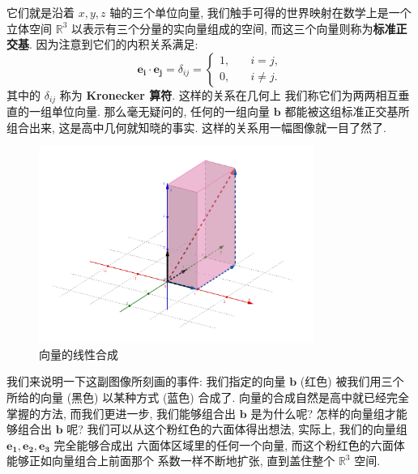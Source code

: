 \documentclass[UTF8]{book}
\begin{document}
    它们就是沿着 $x,y,z$ 轴的三个单位向量, 我们触手可得的世界映射在数学上是一个
    立体空间 $\mathbb{R}^3$ 以表示有三个分量的实向量组成的空间, 
    而这三个向量则称为\textbf{标准正交基}. 因为注意到它们的内积关系满足: 
    \begin{equation} \label{eq. orthonormal basis}
        \boldsymbol{e_i}\cdot \boldsymbol{e_j} = \delta_{ij} = 
        \begin{cases}
            1, \quad & i = j, \\
            0, \quad & i \neq j.
        \end{cases}
    \end{equation}
    其中的 $ \delta_{ij}$ 称为 \textbf{Kronecker 算符}. 这样的关系在几何上
    我们称它们为两两相互垂直的一组单位向量. 那么毫无疑问的, 任何的一组向量 
    $\boldsymbol{b}$ 都能被这组标准正交基所组合出来, 这是高中几何就知晓的事实. 
    这样的关系用一幅图像就一目了然了. 

    \begin{figure}[hbtp]
        \centering
        \includegraphics[width = 0.8\textwidth]{linear equation 1.png}
        \caption{向量的线性合成}
        \label{fig. linear equation 1}
    \end{figure}

    我们来说明一下这副图像所刻画的事件: 我们指定的向量 $\boldsymbol{b}$ 
    (红色) 被我们用三个所给的向量 (黑色) 以某种方式 (蓝色) 合成了. 
    向量的合成自然是高中就已经完全掌握的方法, 而我们更进一步, 我们能够组合出 
    $\boldsymbol{b}$ 是为什么呢? 怎样的向量组才能够组合出 $\boldsymbol{b}$ 
    呢? 我们可以从这个粉红色的六面体得出想法, 实际上, 我们的向量组 
    $\boldsymbol{e_1},\boldsymbol{e_2},\boldsymbol{e_3}$ 完全能够合成出
    六面体区域里的任何一个向量, 而这个粉红色的六面体能够正如向量组合上前面那个
    系数一样不断地扩张, 直到盖住整个 $\mathbb{R}^3$ 空间. 
    
\end{document}
